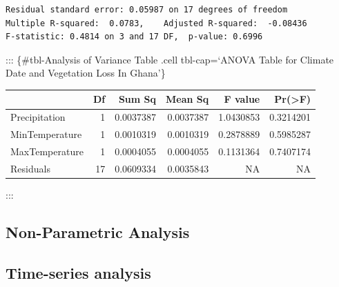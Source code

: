 \documentclass[12pt,a4paper]{book}
\begin{document}
{\begin{verbatim}
Residual standard error: 0.05987 on 17 degrees of freedom
Multiple R-squared:  0.0783,    Adjusted R-squared:  -0.08436 
F-statistic: 0.4814 on 3 and 17 DF,  p-value: 0.6996
\end{verbatim}

::: \{\#tbl-Analysis of Variance Table .cell tbl-cap=`ANOVA Table for
Climate Date and Vegetation Loss In Ghana'\}

\begin{Shaded}
\begin{Highlighting}[]
\OtherTok{\textless{}{-}}\SpecialCharTok{\textasciitilde{}}\SpecialCharTok{+}\SpecialCharTok{+}
\NormalTok{(}\SpecialCharTok{\%\textgreater{}\%}
  \NormalTok{(} \NormalTok{(}\NormalTok{))}
\end{Highlighting}
\end{Shaded}

\begin{table}
\centering
\begin{tabular}{lrrrrr}
\toprule
  & Df & Sum Sq & Mean Sq & F value & Pr(>F)\\
\midrule
Precipitation & 1 & 0.0037387 & 0.0037387 & 1.0430853 & 0.3214201\\
MinTemperature & 1 & 0.0010319 & 0.0010319 & 0.2878889 & 0.5985287\\
MaxTemperature & 1 & 0.0004055 & 0.0004055 & 0.1131364 & 0.7407174\\
Residuals & 17 & 0.0609334 & 0.0035843 & NA & NA\\
\bottomrule
\end{tabular}
\end{table}

:::

\hypertarget{non-parametric-analysis}{%
\subsection{Non-Parametric Analysis}\label{non-parametric-analysis}}

\hypertarget{time-series-analysis}{%
\subsection{\texorpdfstring{\textbf{Time-series
analysis}}{Time-series analysis}}\label{time-series-analysis}}

}
\end{document}
